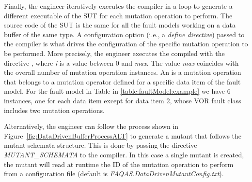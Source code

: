 Finally, the engineer iteratively executes the compiler in a loop to generate a different executable of the SUT for each mutation operation to perform.
The source code of the SUT is the same for all the fault models working on a data buffer of the same type. A configuration option (i.e., a \emph{define directive}) passed to the compiler is what drives the configuration of the specific mutation operation to be performed. 
More precisely, the engineer executes the compiled with the directive , where \emph{i} is a value between 0 and \emph{max}. The value \emph{max} coincides with the
overall number of mutation operation instances. An  is a mutation operation that belongs to a mutation operator defined for a specific data item of the fault model. For the fault model in Table in \ref{table:faultModel:example} we have 6 instances, one for each data item except for data item 2, whose VOR fault class includes two mutation operations.

Alternatively, the engineer can follow the process shown in Figure~\ref{fig:DataDrivenBufferProcessALT} to generate a mutant that follows the mutant schemata structure. This is done by passing the directive \emph{MUTANT\_SCHEMATA} to the compiler. In this case a single mutant is created, the mutant will read at runtime the ID of the mutation operation to perform from a configuration file (default is \emph{FAQAS.DataDrivenMutantConfig.txt}).


